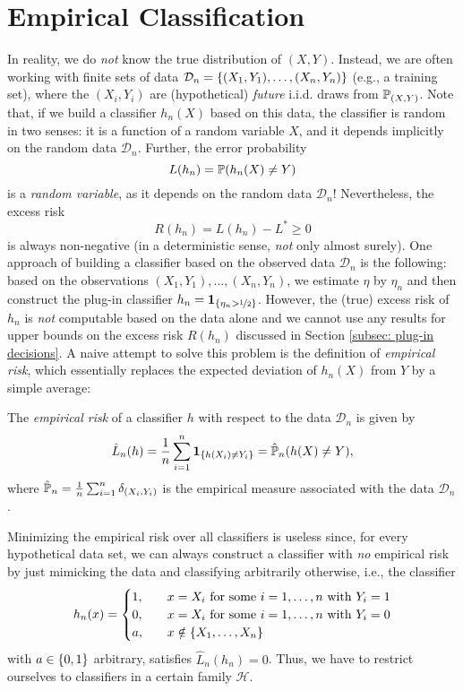 \section{Empirical Classification}
\label{subsec: empirical classification}

In reality, we do \emph{not} know the true distribution of $(X, Y)$. Instead, we are often working with finite sets of data $\mathcal{D}_n = \set{(X_1, Y_1), \dots, (X_n, Y_n)}$ (e.g., a training set), where the $(X_i, Y_i)$ are (hypothetical) \emph{future} i.i.d. draws from $\P_{(X, Y)}$. Note that, if we build a classifier $h_n(X)$ based on this data, the classifier is random in two senses: it is a function of a random variable $X$, and it depends implicitly on the random data $\mathcal{D}_n$. Further, the error probability
\[
    L(h_n) = \P(h_n (X) \neq Y)
\]
is a \emph{random variable}, as it depends on the random data $\mathcal{D}_n$! Nevertheless, the excess risk
\[
    R(h_n) = L(h_n) - L^* \geq 0
\]
is always non-negative (in a deterministic sense, \emph{not} only almost surely). One approach of building a classifier based on the observed data $\mathcal{D}_n$ is the following: based on the observations $(X_1, Y_1), \dots, (X_n, Y_n)$, we estimate $\eta$ by $\eta_n$ and then construct the plug-in classifier $h_n = \indSet{\eta_n > \nicefrac{1}{2}}$. However, the (true) excess risk of $h_n$ is \emph{not} computable based on the data alone and we cannot use any results for upper bounds on the excess risk $R(h_n)$ discussed in Section \ref{subsec: plug-in decisions}. A naive attempt to solve this problem is the definition of \emph{empirical risk}, which essentially replaces the expected deviation of $h_n(X)$ from $Y$ by a simple average:

\begin{definition}
The \emph{empirical risk} of a classifier $h$ with respect to the data $\mathcal{D}_n$ is given by
\[
    \hat L_n(h) = \frac{1}{n} \sum_{i=1}^n \indSet{h(X_i) \neq Y_i} = \hat{\P}_n(h(X) \neq Y),
\]
where $\hat{\P}_n = \frac{1}{n} \sum_{i=1}^n \delta_{(X_i, Y_i)}$ is the empirical measure associated with the data $\mathcal{D}_n$.
\end{definition}

Minimizing the empirical risk over all classifiers is useless since, for every hypothetical data set, we can always construct a classifier with \emph{no} empirical risk by just mimicking the data and classifying arbitrarily otherwise, i.e., the classifier
\[
    h_n(x) = \begin{cases}
        1, \quad &x = X_i \text{ for some } i = 1, \dots, n \text{ with } Y_i = 1 \\
        0, \quad &x = X_i \text{ for some } i = 1, \dots, n \text{ with } Y_i = 0 \\
        a, \quad &x \notin \set{X_1, \dots, X_n}
    \end{cases}
\]
with $a \in \set{0, 1}$ arbitrary, satisfies $\hat L_n(h_n) = 0$. Thus, we have to restrict ourselves to classifiers in a certain family $\mathcal{H}$.

